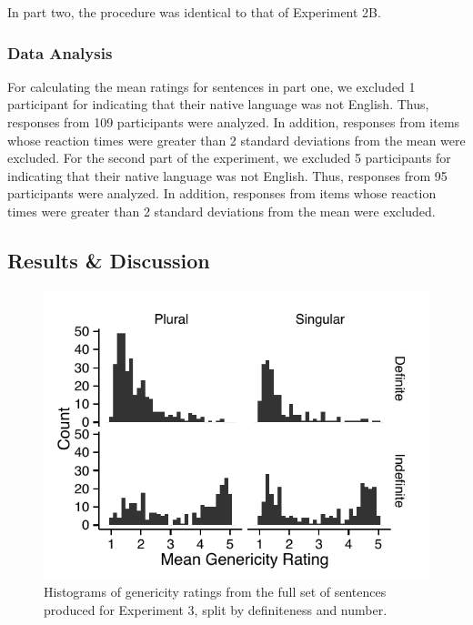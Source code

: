 \documentclass[10pt,letterpaper]{article}
\begin{document}
In part two, the procedure was identical to that of Experiment 2B. 

\subsubsection{Data Analysis} \quad For calculating the mean ratings for sentences in part one, we excluded 1 participant for indicating that their native language was not English. Thus, responses from 109 participants were analyzed. In addition, responses from items whose reaction times were greater than 2 standard deviations from the mean were excluded. For the second part of the experiment, we excluded 5 participants for indicating that their native language was not English. Thus, responses from 95 participants were analyzed. In addition, responses from items whose reaction times were greater than 2 standard deviations from the mean were excluded.

\subsection{Results \& Discussion}

\begin{figure}[t]
\centering
\includegraphics[width=\linewidth]{figures/e3_norming_mod.pdf}
\caption{\label{fig:e3norming} Histograms of genericity ratings from the full set of sentences produced for Experiment 3, split by definiteness and number.} 
\end{figure}
\end{document}
